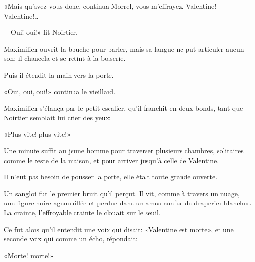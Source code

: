 «Mais qu'avez-vous donc, continua Morrel, vous m'effrayez. Valentine! Valentine!\dots 

—Oui! oui!» fit Noirtier. 

Maximilien ouvrit la bouche pour parler, mais sa langue ne put articuler aucun son: il chancela et se retint à la boiserie. 

Puis il étendit la main vers la porte. 

«Oui, oui, oui!» continua le vieillard. 

Maximilien s'élança par le petit escalier, qu'il franchit en deux bonds, tant que Noirtier semblait lui crier des yeux: 

«Plus vite! plus vite!» 

Une minute suffit au jeune homme pour traverser plusieurs chambres, solitaires comme le reste de la maison, et pour arriver jusqu'à celle de Valentine. 

Il n'eut pas besoin de pousser la porte, elle était toute grande ouverte. 

Un sanglot fut le premier bruit qu'il perçut. Il vit, comme à travers un nuage, une figure noire agenouillée et perdue dans un amas confus de draperies blanches. La crainte, l'effroyable crainte le clouait sur le seuil. 

Ce fut alors qu'il entendit une voix qui disait: «Valentine est morte», et une seconde voix qui comme un écho, répondait: 

«Morte! morte!» 